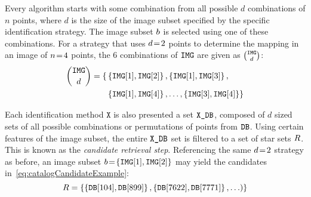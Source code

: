 Every algorithm starts with some combination from all possible $d$ combinations of $n$ points, where $d$ is the size of the image subset specified by the specific identification strategy.
The image subset $b$ is selected using one of these combinations.
For a strategy that uses $d\!=\!2$ points to determine the mapping in an image of $n\!=\! 4$ points, the 6 combinations of $\texttt{IMG}$ are given as $\binom{\texttt{IMG}}{d}$:
\begin{equation}
    \begin{aligned}
	    \binom{\texttt{IMG}}{d} = \{&
	    	\left\{ \texttt{IMG}[1], \texttt{IMG}[2] \right\},
	    	\left\{ \texttt{IMG}[1], \texttt{IMG}[3] \right\}, \\
	       &\left\{ \texttt{IMG}[1], \texttt{IMG}[4] \right\}, \ldots,
	        \left\{ \texttt{IMG}[3], \texttt{IMG}[4] \right\}
	        \}
    \end{aligned}
\end{equation}

Each identification method $\texttt{X}$ is also presented a set $\texttt{X\_DB}$, composed of $d$ sized sets of all possible combinations or permutations of points from $\texttt{DB}$.
Using certain features of the image subset, the entire $\texttt{X\_DB}$ set is filtered to a set of star sets $R$.
This is known as the \emph{candidate retrieval step}.
Referencing the same $d\!=\! 2$ strategy as before, an image subset $b \!=\! \left\{ \texttt{IMG}[1], \texttt{IMG}[2] \right\}$ may yield the candidates in~\autoref{eq:catalogCandidateExample}:
\begin{equation}
	\label{eq:catalogCandidateExample}
    \databasesubset = \set{ \set{\vv{\databaseset[104]}, \vv{\databaseset[899]}}, \set{\vv{\databaseset[7622]}, \vv{\databaseset[7771]}}, \ldots) } 
\end{equation}


